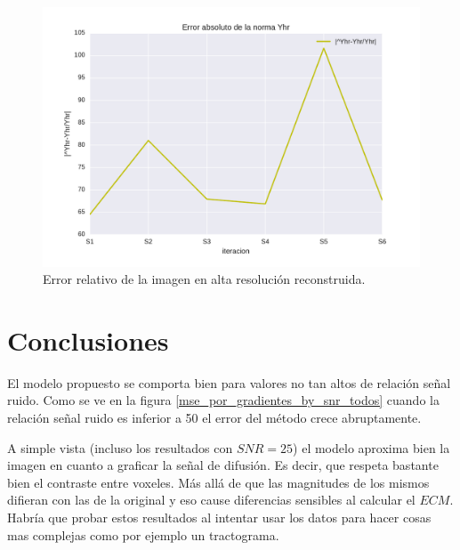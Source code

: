 \documentclass[a4paper,10pt]{article}%
\begin{document}
\begin{figure}[H]
\centering        
\includegraphics[scale=0.7]{eabs_norma_yhr.pdf}
\caption{Error relativo de la imagen en alta resolución reconstruida. }
\end{figure}


\clearpage
\section{Conclusiones}
%
El modelo propuesto se comporta bien para valores no tan altos de relación señal ruido. Como se ve 
en la figura \ref{mse_por_gradientes_by_snr_todos} cuando la relación señal ruido es 
inferior a 50 el error del método crece abruptamente. 

A simple vista (incluso los resultados con $SNR=25$) el modelo aproxima bien la 
imagen en cuanto a graficar la señal de difusión. Es decir, que respeta 
bastante bien el contraste entre voxeles. Más allá de que las magnitudes de los 
mismos difieran con las de la original y eso cause diferencias sensibles al 
calcular el $ECM$. Habría que probar estos resultados al intentar 
usar los datos para hacer cosas mas complejas como por ejemplo un tractograma.

%



\clearpage


\end{document}
